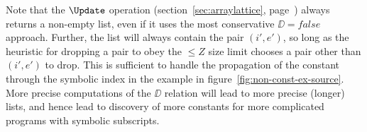 Note that the $\Update$ operation (section~\ref{sec:arraylattice},
page~\pageref{def:update}) always returns a non-empty list,
even if it uses the most conservative $\DD = false$ approach.
Further, the list will always 
contain the pair $(i',e')$, so long as the heuristic
for dropping a pair to obey the $\leq Z$ size limit chooses
a pair other than $(i',e')$ to drop.
This is sufficient to handle
the propagation of the constant through the symbolic index in the
example in figure~\ref{fig:non-const-ex-source}.
More precise computations of the $\DD$ relation will lead to 
more precise (longer) lists, and hence lead to discovery of
more
constants  for more complicated programs with symbolic subscripts.








